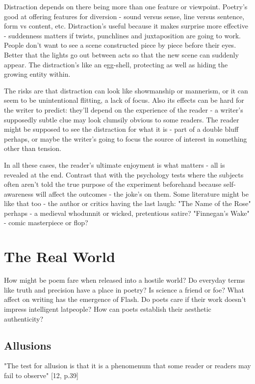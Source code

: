 \documentclass[11pt]{article}
\begin{document}
Distraction depends on there being more than one feature or viewpoint. Poetry's good at offering features for diversion - sound versus sense, line versus sentence, form vs content, etc. Distraction's useful because it makes surprise more effective - suddenness matters if twists, punchlines and juxtaposition are going to work. People don't want to see a scene constructed piece by piece before their eyes. Better that the lights go out between acts so that the new scene can suddenly appear. The distraction's like an egg-shell, protecting as well as hiding the growing entity within.

The risks are that distraction can look like showmanship or mannerism, or it can seem to be unintentional flitting, a lack of focus. Also its effects can be hard for the writer to predict: they'll depend on the experience of the reader - a writer's supposedly subtle clue may look clumsily obvious to some readers. The reader might be supposed to see the distraction for what it is - part of a double bluff perhaps, or maybe the writer's going to focus the source of interest in something other than tension.

In all these cases, the reader's ultimate enjoyment is what matters - all is revealed at the end. Contrast that with the psychology tests where the subjects often aren't told the true purpose of the experiment beforehand because self-awareness will affect the outcomes - the joke's on them. Some literature might be like that too - the author or critics having the last laugh: "The Name of the Rose" perhaps - a medieval whodunnit or wicked, pretentious satire? "Finnegan's Wake" - comic masterpiece or flop? 




\newpage\section{The Real World}

How might be poem fare when released into a hostile world? Do everyday terms like truth and precision have a place in poetry? Is science a friend or foe? What affect on writing has the emergence of Flash. Do poets care if their work doesn't impress intelligent latpeople? How can poets establish their aesthetic authenticity?

\subsection{Allusions}

"The test for allusion is that it is a phenomenum that some reader or readers may fail to observe" [12, p.39]
\end{document}
